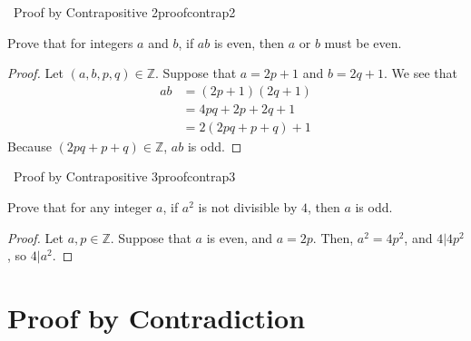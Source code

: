     \pagebreak
    \begin{exercise}{\Difficulty\,\Difficulty\,\,Proof by Contrapositive 2}{proofcontrap2}
    
    Prove that for integers \(a\) and \(b\), if \(ab\) is even, then \(a\) or \(b\) must be even.
    
    \begin{proof}
        Let \((a,b,p,q)\in\mathbb{Z}\). Suppose that \(a=2p+1\) and \(b=2q+1\). We see that
        \begin{align*}
            ab&=(2p+1)(2q+1) \\
            &=4pq+2p+2q+1 \\
            &=2(2pq+p+q)+1
        \end{align*}
        Because \((2pq+p+q)\in\mathbb{Z}\), \(ab\) is odd.
    \end{proof}
    
    \end{exercise}
    \begin{exercise}{\Difficulty\,\Difficulty\,\,Proof by Contrapositive 3}{proofcontrap3}
    
    Prove that for any integer \(a\), if \(a^2\) is not divisible by \(4\), then \(a\) is odd.
    
    \begin{proof}
        Let \(a,p\in\mathbb{Z}\). Suppose that \(a\) is even, and \(a=2p\). Then, \(a^2=4p^2\), and \(4|4p^2\), so \(4|a^2\).
    \end{proof}
    
    \end{exercise}
    
\section{Proof by Contradiction}

